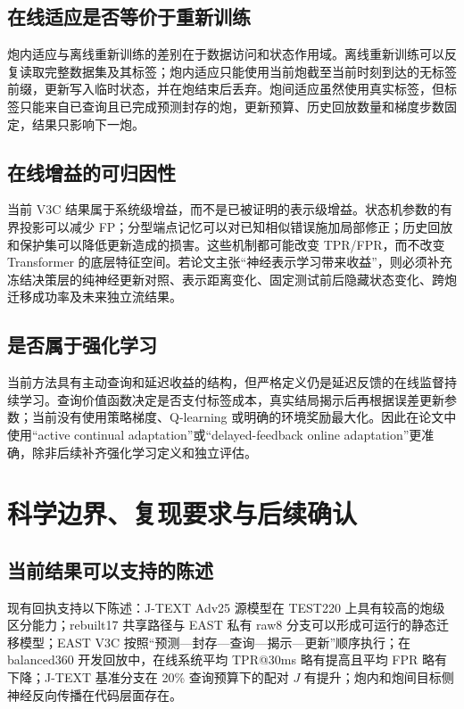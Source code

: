 \documentclass[11pt,a4paper]{article}
\begin{document}
\subsection{在线适应是否等价于重新训练}

炮内适应与离线重新训练的差别在于数据访问和状态作用域。离线重新训练可以反复读取完整数据集及其标签；炮内适应只能使用当前炮截至当前时刻到达的无标签前缀，更新写入临时状态，并在炮结束后丢弃。炮间适应虽然使用真实标签，但标签只能来自已查询且已完成预测封存的炮，更新预算、历史回放数量和梯度步数固定，结果只影响下一炮。

\subsection{在线增益的可归因性}

当前 V3C 结果属于系统级增益，而不是已被证明的表示级增益。状态机参数的有界投影可以减少 FP；分型端点记忆可以对已知相似错误施加局部修正；历史回放和保护集可以降低更新造成的损害。这些机制都可能改变 TPR/FPR，而不改变 Transformer 的底层特征空间。若论文主张“神经表示学习带来收益”，则必须补充冻结决策层的纯神经更新对照、表示距离变化、固定测试前后隐藏状态变化、跨炮迁移成功率及未来独立流结果。

\subsection{是否属于强化学习}

当前方法具有主动查询和延迟收益的结构，但严格定义仍是延迟反馈的在线监督持续学习。查询价值函数决定是否支付标签成本，真实结局揭示后再根据误差更新参数；当前没有使用策略梯度、Q-learning 或明确的环境奖励最大化。因此在论文中使用“active continual adaptation”或“delayed-feedback online adaptation”更准确，除非后续补齐强化学习定义和独立评估。

\section{科学边界、复现要求与后续确认}

\subsection{当前结果可以支持的陈述}

现有回执支持以下陈述：J-TEXT Adv25 源模型在 TEST220 上具有较高的炮级区分能力；rebuilt17 共享路径与 EAST 私有 raw8 分支可以形成可运行的静态迁移模型；EAST V3C 按照“预测—封存—查询—揭示—更新”顺序执行；在 balanced360 开发回放中，在线系统平均 TPR@30ms 略有提高且平均 FPR 略有下降；J-TEXT 基准分支在 20\% 查询预算下的配对 \(J\) 有提升；炮内和炮间目标侧神经反向传播在代码层面存在。
\end{document}
